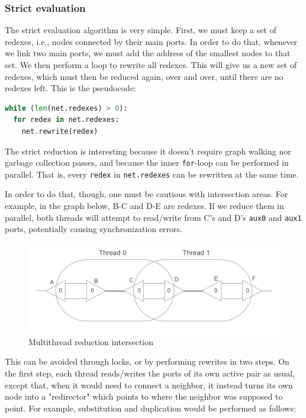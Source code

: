 \documentclass{article}
\theoremstyle{definition}
\theoremstyle{theorem}
\begin{document}
\subsubsection{Strict evaluation}

The strict evaluation algorithm is very simple. First, we must keep a set of
redexes, i.e., nodes connected by their main ports. In order to do that,
whenever we link two main ports, we must add the address of the smallest nodes
to that set. We then perform a loop to rewrite all redexes. This will give us a
new set of redexes, which must then be reduced again, over and over, until there
are no redexes left. This is the pseudocode:

\begin{lstlisting}[language=Python]
while (len(net.redexes) > 0):
  for redex in net.redexes:
    net.rewrite(redex)
\end{lstlisting}

The strict reduction is interesting because it doesn't require graph walking nor
garbage collection passes, and because the inner \verb|for|-loop can be
performed in parallel. That is, every \verb|redex| in \verb|net.redexes| can be
rewritten at the same time.

In order to do that, though, one must be cautious with intersection areas. For
example, in the graph below, B-C and D-E are redexes. If we reduce them in
parallel, both threads will attempt to read/write from C's and D's \verb|aux0|
and \verb|aux1| ports, potentially causing synchronization errors.

\begin{figure}[H]
  \includegraphics[width=\linewidth]{sk_problem_2x.png}
  \caption{Multithread reduction intersection}
\end{figure}

This can be avoided through locks, or by performing rewrites in two steps. On
the first step, each thread reads/writes the ports of its own active pair as
usual, except that, when it would need to connect a neighbor, it instead turns
its own node into a "redirector" which points to where the neighbor was supposed
to point. For example, substitution and duplication would be performed as
follows:
\end{document}
